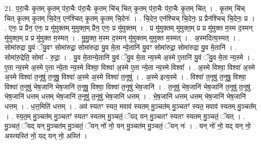 \documentclass[17pt]{extarticle}
\begin{document}
21. प॒रा॒चैः कृ॒तम् कृ॒तम् प॑रा॒चैः प॑रा॒चैः कृ॒तम् चि॑च् चित् कृ॒तम् प॑रा॒चैः प॑रा॒चैः कृ॒तम् चि॑त् । . कृ॒तम् चि॑च् चित् कृ॒तम् कृ॒तम् चि॒देन॒ एन॑श्चित् कृ॒तम् कृ॒तम् चि॒देनः॑ । . चि॒देन॒ एन॑श्चिच् चि॒देनः॒ प्र प्रैन॑श्चिच् चि॒देनः॒ प्र । . एनः॒ प्र प्रैन॒ एनः॒ प्र मु॑मुक्तम् मुमुक्त॒म् प्रैन॒ एनः॒ प्र मु॑मुक्तम् । . प्र मु॑मुक्तम् मुमुक्त॒म् प्र प्र मु॑मुक्त म॒स्म द॒स्मन् मु॑मुक्त॒म् प्र प्र मु॑मुक्त म॒स्मत् । . मु॒मु॒क्त॒ म॒स्म द॒स्मन् मु॑मुक्तम् मुमुक्त म॒स्मत् । . अ॒स्मदित्य॒स्मत् । . सोमा॑रुद्रा यु॒वं ॅयु॒वꣳ सोमा॑रुद्रा॒ सोमा॑रुद्रा यु॒व मे॒ता न्ये॒तानि॑ यु॒वꣳ सोमा॑रुद्रा॒ सोमा॑रुद्रा यु॒व मे॒तानि॑ । . सोमा॑रु॒द्रेति॒ सोमा᳚ - रु॒द्रा॒ । . यु॒व मे॒तान्ये॒तानि॑ यु॒वं ॅयु॒व मे॒ता न्य॒स्मे अ॒स्मे ए॒तानि॑ यु॒वं ॅयु॒व मे॒ता न्य॒स्मे । . ए॒ता न्य॒स्मे अ॒स्मे ए॒ता न्ये॒ता न्य॒स्मे विश्वा॒ विश्वा॑ अ॒स्मे ए॒ता न्ये॒ता न्य॒स्मे विश्वा᳚ । . अ॒स्मे विश्वा॒ विश्वा॑ अ॒स्मे अ॒स्मे विश्वा॑ त॒नूषु॑ त॒नूषु॒ विश्वा॑ अ॒स्मे अ॒स्मे विश्वा॑ त॒नूषु॑ । . अ॒स्मे इत्य॒स्मे । . विश्वा॑ त॒नूषु॑ त॒नूषु॒ विश्वा॒ विश्वा॑ त॒नूषु॑ भेष॒जानि॑ भेष॒जानि॑ त॒नूषु॒ विश्वा॒ विश्वा॑ त॒नूषु॑ भेष॒जानि॑ । . त॒नूषु॑ भेष॒जानि॑ भेष॒जानि॑ त॒नूषु॑ त॒नूषु॑ भेष॒जानि॑ धत्तम् धत्तम् भेष॒जानि॑ त॒नूषु॑ त॒नूषु॑ भेष॒जानि॑ धत्तम् । . भे॒ष॒जानि॑ धत्तम् धत्तम् भेष॒जानि॑ भेष॒जानि॑ धत्तम् । . ध॒त्त॒मिति॑ धत्तम् । . अव॑ स्यतꣳ स्यत॒ मवाव॑ स्यतम् मु॒ञ्चत॑म् मु॒ञ्चतꣳ॑ स्यत॒ मवाव॑ स्यतम् मु॒ञ्चत᳚म् । . स्य॒त॒म् मु॒ञ्चत॑म् मु॒ञ्चतꣳ॑ स्यतꣳ स्यतम् मु॒ञ्चतं॒ ॅयद् यन् मु॒ञ्चतꣳ॑ स्यतꣳ स्यतम् मु॒ञ्चतं॒ ॅयत् । . मु॒ञ्चतं॒ ॅयद् यन् मु॒ञ्चत॑म् मु॒ञ्चतं॒ ॅयन् नो॑ नो॒ यन् मु॒ञ्चत॑म् मु॒ञ्चतं॒ ॅयन् नः॑ । . यन् नो॑ नो॒ यद् यन् नो॒ अस्त्यस्ति॑ नो॒ यद् यन् नो॒ अस्ति॑ । \newline
\end{document}
